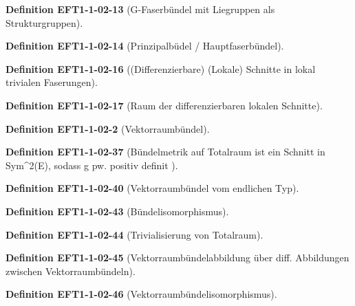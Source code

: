 \documentclass[10pt, letterpaper]{article}
\newcommand{\CustomHeading}[3]{%
  \par\medskip\noindent%
  \textbf{#1 #2} \textnormal{(#3)}.\enskip%
}
\newenvironment{DEF}[2]{\CustomHeading{Definition}{#1}{#2}}{}
\begin{document}
\begin{DEF}{EFT1-1-02-13}{G-Faserbündel mit Liegruppen als Strukturgruppen}

\end{DEF}

\begin{DEF}{EFT1-1-02-14}{Prinzipalbüdel / Hauptfaserbündel}

\end{DEF}

\begin{DEF}{EFT1-1-02-16}{(Differenzierbare) (Lokale) Schnitte in lokal trivialen Faserungen}

\end{DEF}

\begin{DEF}{EFT1-1-02-17}{Raum der differenzierbaren lokalen Schnitte}

\end{DEF}

\begin{DEF}{EFT1-1-02-2}{Vektorraumbündel}

\end{DEF}

\begin{DEF}{EFT1-1-02-37}{Bündelmetrik auf Totalraum ist ein Schnitt in Sym^2(E), sodass g pw. positiv definit }

\end{DEF}

\begin{DEF}{EFT1-1-02-40}{Vektorraumbündel vom endlichen Typ}

\end{DEF}

\begin{DEF}{EFT1-1-02-43}{Bündelisomorphismus}

\end{DEF}

\begin{DEF}{EFT1-1-02-44}{Trivialisierung von Totalraum}

\end{DEF}

\begin{DEF}{EFT1-1-02-45}{Vektorraumbündelabbildung über diff. Abbildungen zwischen Vektorraumbündeln}

\end{DEF}

\begin{DEF}{EFT1-1-02-46}{Vektorraumbündelisomorphismus}

\end{DEF}
\end{document}
